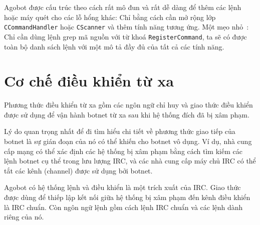 Agobot được cấu trúc theo cách rất mô đun và rất dễ dàng để thêm các lệnh
hoặc máy quét cho các lỗ hổng khác:
Chỉ bằng cách cần mở rộng lớp \texttt{CCommandHandler} hoặc
\texttt{CScanner} và thêm tính năng tương ứng.
Một mẹo nhỏ~\cite{honeynetgrep}:
Chỉ cần dùng lệnh grep mã nguồn với từ khoá \texttt{RegisterCommand},
ta sẽ có được toàn bộ danh sách lệnh với một mô tả đầy đủ của tất cả các tính năng.

\section{Cơ chế điều khiển từ xa}

Phương thức điều khiển từ xa gồm các ngôn ngữ chỉ huy và giao thức điều khiển được sử dụng
để vận hành botnet từ xa sau khi hệ thống đích đã bị xâm phạm.

Lý do quan trọng nhất để đi tìm hiểu chi tiết về phương thức
giao tiếp của botnet là sự gián đoạn của nó có thể khiến cho botnet vô dụng.
Ví dụ, nhà cung cấp mạng có thể xác định các hệ thống bị xâm phạm bằng cách
tìm kiếm các lệnh botnet cụ thể trong lưu lượng IRC, và các nhà cung cấp
máy chủ IRC có thể tắt các kênh (channel) được sử dụng bởi botnet.

Agobot có hệ thống lệnh và điều khiển là một trích xuất của IRC\@.
Giao thức được dùng để thiếp lập kết nối giữa hệ thống bị xâm phạm đến kênh điều khiển là IRC chuẩn.
Còn ngôn ngữ lệnh gồm cách lệnh IRC chuẩn và các lệnh dành riêng của nó.


